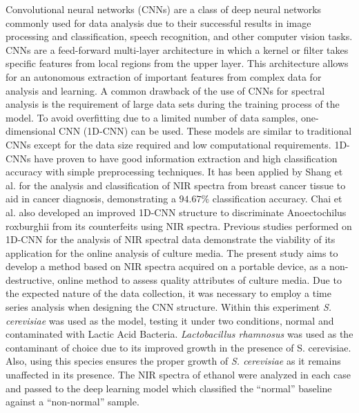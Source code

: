\documentclass[12pt]{report}
\renewcommand{\cite}{\supercite}
\begin{document}
Convolutional neural networks (CNNs) are a class of deep neural networks commonly used for data analysis due to their successful results in image processing and classification,\cite{AnalysisConvolutionalNeuralsharma2018} speech recognition,\cite{SpeechRecognitionUsingalsobhani2021} and other computer vision tasks. CNNs are a feed-forward multi-layer architecture in which a kernel or filter takes specific features from local regions from the upper layer.  This architecture allows for an autonomous extraction of important features from complex data for analysis and learning.\cite{NIRSpectroscopyCombinedshang2023} A common drawback of the use of CNNs for spectral analysis is the requirement of large data sets during the training process of the model.\cite{zhangNearInfraredSpectralCharacteristic2022} To avoid overfitting due to a limited number of data samples, one-dimensional CNN (1D-CNN) can be used. These models are similar to traditional CNNs except for the data size required and low computational requirements. 1D-CNNs have proven to have good information extraction and high classification accuracy with simple preprocessing techniques. It has been applied by Shang et al.\cite{NIRSpectroscopyCombinedshang2023} for the analysis and classification of NIR spectra from breast cancer tissue to aid in cancer diagnosis, demonstrating a $94.67\%$ classification accuracy. Chai et al.\cite{Improved1DConvolutionalchai2021} also developed an improved 1D-CNN structure to discriminate Anoectochilus roxburghii from its counterfeits using NIR spectra.
Previous studies performed on 1D-CNN for the analysis of NIR spectral data demonstrate the viability of its application for the online analysis of culture media. The present study aims to develop a method based on NIR spectra acquired on a portable device, as a non-destructive, online method to assess quality attributes of culture media. Due to the expected nature of the data collection, it was necessary to employ a time series analysis when designing the CNN structure. Within this experiment \emph{S. cerevisiae} was used as the model, testing it under two conditions, normal and contaminated with Lactic Acid Bacteria. \emph{Lactobacillus rhamnosus} was used as the contaminant of choice due to its improved growth in the presence of S. cerevisiae. Also, using this species ensures the proper growth of \emph{S. cerevisiae} as it remains unaffected in its presence.\cite{YeastHumanCoevolutionnenciarini2024} The NIR spectra of ethanol were analyzed in each case and passed to the deep learning model which classified the “normal” baseline against a “non-normal” sample. 
\end{document}
